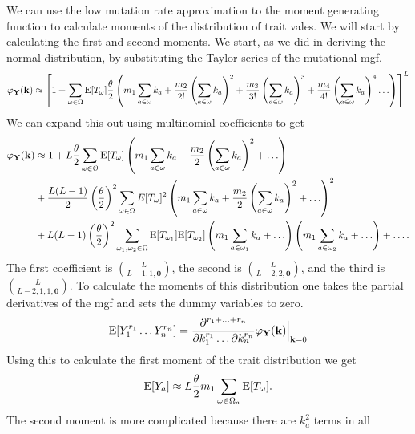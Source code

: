 We can use the low mutation rate approximation to the moment generating function
to calculate moments of the distribution of trait vales. We will start by
calculating the first and second moments. We start, as we did in deriving the
normal distribution, by substituting the Taylor series of the mutational mgf.
\begin{equation}
  \label{eq:mgf_approx_sub}
  \varphi_{\mathbf{Y}}(\mathbf{k}) \approx \left[ 1 + \sum_{\omega \in \Omega}
    \mathrm{E}[T_\omega] \frac{\theta}{2} \left( m_1 \sum_{a \in \omega} k_a +
    \frac{m_2}{2!}\left( \sum_{a \in \omega} k_a\right)^2 +
    \frac{m_3}{3!}\left( \sum_{a \in \omega} k_a\right)^3 +
    \frac{m_4}{4!}\left( \sum_{a \in \omega} k_a\right)^4 \ldots \right) \right]^L
\end{equation}
We can expand this out using multinomial coefficients to get
\begin{align}
  \label{eq:mgf_approx_expand}
  \varphi_{\mathbf{Y}}(\mathbf{k}) &\approx 1 +
  L\frac{\theta}{2} \sum_{\omega \in \mathcal{O}} \mathrm{E}[T_{\omega}]\left( m_1 \sum_{a \in \omega} k_a +
  \frac{m_2}{2}\left( \sum_{a \in \omega} k_a\right)^2 + \ldots \right) \nonumber \\
  &+ \frac{L(L-1)}{2} \left(\frac{\theta}{2}\right)^2 \sum_{\omega \in \Omega} E[T_{\omega}]^2
  \left( m_1 \sum_{a \in \omega} k_a +
  \frac{m_2}{2}\left( \sum_{a \in \omega} k_a\right)^2 + \ldots \right)^2 \nonumber \\
  &+ L(L-1)\left(\frac{\theta}{2}\right)^2\sum_{\omega_1, \omega_2 \in \Omega}\mathrm{E}[T_{\omega_1}]\mathrm{E}[T_{\omega_2}]
  \left( m_1 \sum_{a \in \omega_1} k_a + \ldots \right)
  \left( m_1 \sum_{a \in \omega_2} k_a + \ldots \right) + \ldots.
\end{align}
The first coefficient is $\binom{L}{L-1,1,\mathbf{0}}$, the second is
$\binom{L}{L-2,2,\mathbf{0}}$, and the third is $\binom{L}{L-2,1,1,\mathbf{0}}$.
To calculate the moments of this distribution one takes the partial derivatives
of the mgf and sets the dummy variables to zero.
\begin{equation}
  \label{eq:deriv}
  \mathrm{E}[Y_1^{r_1}\ldots Y_n^{r_n}] = \frac{\partial^{r_1 + \ldots + r_n}}{\partial k_1^{r_1} \ldots \partial k_n^{r_n}}
  \varphi_{\mathbf{Y}}(\mathbf{k})\Bigr|_{\mathbf{k}=0}
\end{equation}
Using this to calculate the first moment of the trait distribution we get
\begin{equation}
  \label{eq:mom1}
  \mathrm{E}[Y_a] \approx L\frac{\theta}{2} m_1 \sum_{\omega \in \Omega_a} \mathrm{E}[T_\omega].
\end{equation}
The second moment is more complicated because there are $k_a^2$ terms in all
